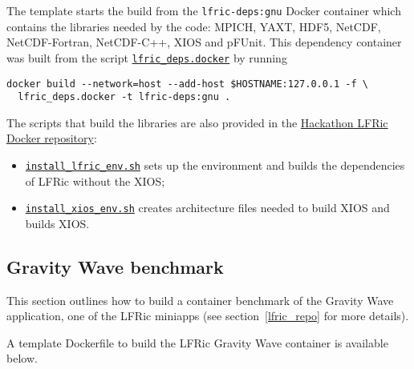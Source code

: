 \documentclass[twoside,a4paper,12pt]{article}
\begin{document}
The template starts the build from the \texttt{lfric-deps:gnu} Docker container
which contains the libraries needed by the code: MPICH, YAXT, HDF5, NetCDF,
NetCDF-Fortran, NetCDF-C++, XIOS and pFUnit. This dependency container was built
from the script
\href{https://github.com/eth-cscs/ContainerHackathon/blob/master/LFRIC/docker/lfric_deps.docker}
{\texttt{lfric\_deps.docker}} by running

\begin{Verbatim}[fontsize=\small]
docker build --network=host --add-host $HOSTNAME:127.0.0.1 -f \
  lfric_deps.docker -t lfric-deps:gnu .
\end{Verbatim}

The scripts that build the libraries are also provided in the
\href{https://github.com/eth-cscs/ContainerHackathon/tree/master/LFRIC/docker}
{Hackathon LFRic Docker repository}:
\begin{itemize}
\item \href{https://github.com/eth-cscs/ContainerHackathon/blob/master/LFRIC/docker/install_lfric_env.sh}
{\texttt{install\_lfric\_env.sh}} sets up the environment and builds the dependencies of
LFRic without the XIOS;
\item \href{https://github.com/eth-cscs/ContainerHackathon/blob/master/LFRIC/docker/install_xios_env.sh}
{\texttt{install\_xios\_env.sh}} creates architecture files needed to build XIOS and builds XIOS.
\end{itemize}
%
%
\subsection{Gravity Wave benchmark}\label{gwave_benchmark}

This section outlines how to build a container benchmark of the Gravity Wave
application, one of the LFRic miniapps (see section~\ref{lfric_repo} for more
details).

A template Dockerfile to build the LFRic Gravity Wave container is available below.
\end{document}

